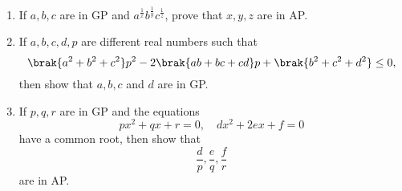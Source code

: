 \begin{enumerate}[label=\thesubsection.\arabic*, ref=\thesubsection.\theenumi]
\item If $a,b,c$ are in GP and $a^{\frac{1}{x}}b^{\frac{1}{y}}c^{\frac{1}{z}}$, prove that $x,y,z$ are in AP.
\item If $a, b, c, d, p$ are different real numbers such that 
	$$\brak{a^2+b^2+c^2}p^2-2\brak{ab+bc+cd}p+\brak{b^2+c^2+d^2} \le 0,$$ then show that $a,b,c$ and $d$ are in GP.
\item If $p,q,r$ are in GP and the equations 
	$$px^2+qx+r = 0, \quad dx^2+2ex+f = 0$$
	have a common root, then show that
	$$\frac{d}{p},\frac{e}{q},\frac{f}{r}$$ are in AP.
\end{enumerate}
